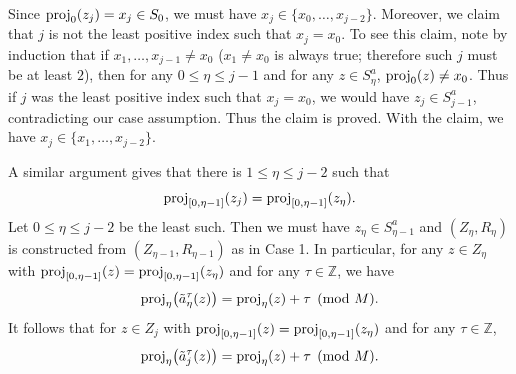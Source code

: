 \documentclass[10pt,a4paper]{amsart}
\theoremstyle{definition}
\theoremstyle{definition}
\numberwithin{equation}{section}
\begin{document}
Since $\mbox{\rm proj}_0(z_j)=x_j\in S_0$, we must have $x_j\in \{x_0, \dots, x_{j-2}\}$. Moreover, we claim that $j$ is not the least positive index such that $x_j=x_0$. To see this claim, note by induction that if $x_1, \dots, x_{j-1}\neq x_0$ ($x_1\neq x_0$ is always true; therefore such $j$ must be at least $2$), then for any $0\leq \eta\leq j-1$ and for any $z\in S_\eta^a$, $\mbox{\rm proj}_0(z)\neq x_0$. Thus if $j$ was the least positive index such that $x_j=x_0$, we would have $z_j\in S_{j-1}^a$, contradicting our case assumption. Thus the claim is proved. With the claim, we have $x_j\in \{x_1, \dots, x_{j-2}\}$.

A similar argument gives that there is $1\leq \eta\leq j-2$ such that 
\begin{equation}\label{eqn:criterion}\mbox{\rm proj}_{[0,\eta-1]}(z_j)=\mbox{\rm proj}_{[0,\eta-1]}(z_\eta). \end{equation} Let $0\leq \eta\leq j-2$ be the least such. Then we must have $z_\eta\in S_{\eta-1}^a$ and $(Z_\eta, R_\eta)$ is constructed from $(Z_{\eta-1}, R_{\eta-1})$ as in Case 1. In particular, for any $z\in Z_\eta$ with $\mbox{\rm proj}_{[0,\eta-1]}(z)=\mbox{\rm proj}_{[0,\eta-1]}(z_\eta)$ and for any $\tau\in \mathbb{Z}$, we have 
$$\mbox{\rm proj}_\eta\big(\tilde{a}_\eta^\tau(z)\big)=\mbox{\rm proj}_\eta(z)+\tau\pmod{M}.$$It follows that for $z\in Z_j$ with $\mbox{\rm proj}_{[0,\eta-1]}(z)=\mbox{\rm proj}_{[0, \eta-1]}(z_\eta)$ and for any $\tau\in \mathbb{Z}$, 
$$\mbox{\rm proj}_\eta\big(\tilde{a}_j^\tau(z)\big)=\mbox{\rm proj}_\eta(z)+\tau\pmod{M}.$$
\end{document}
